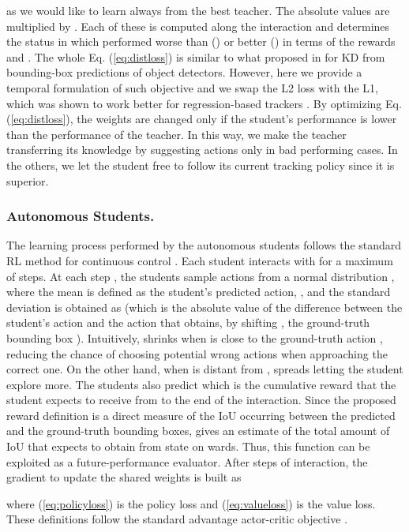 \documentclass[runningheads]{llncs}
\begin{document}
as we would like to learn always from the best teacher.
The absolute values are multiplied by . Each of these is computed along the interaction and determines the status in which  performed worse than  () or better () in terms of the rewards  and . The whole Eq. (\ref{eq:distloss}) is similar to what proposed in \cite{Chen2017} for KD from bounding-box predictions of object detectors. However, here we provide a temporal formulation of such objective and we swap the L2 loss with the L1, which was shown to work better for regression-based trackers \cite{GOTURN,RE3}.
By optimizing Eq. (\ref{eq:distloss}), the weights  are changed only if the student's performance is lower than the performance of the teacher. In this way, we make the teacher transferring its knowledge by suggesting actions only in bad performing cases. In the others, we let the student free to follow its current tracking policy since it is superior. 

\subsubsection{Autonomous Students.} The learning process performed by the autonomous students follows the standard RL method for continuous control \cite{SuttonBarto2018}. Each student interacts with  for a maximum of  steps. At each step , the students sample actions from a normal distribution , where the mean is defined as the student's predicted action, , and the standard deviation is obtained as  (which is the absolute value of the difference between the student's action and the action that obtains, by shifting , the ground-truth bounding box ). Intuitively,  shrinks when  is close to the ground-truth action , reducing the chance of choosing potential wrong actions when approaching the correct one. On the other hand, when  is distant from ,  spreads letting the student explore more. 
The students also predict  which is the cumulative reward that the student expects to receive from  to the end of the interaction. Since the proposed reward definition is a direct measure of the IoU occurring between the predicted and the ground-truth bounding boxes,  gives an estimate of the total amount of IoU that  expects to obtain from state  on wards. Thus, this function can be exploited as a future-performance evaluator. 
After  steps of interaction, the gradient to update the shared weights  is built as

where (\ref{eq:policyloss}) is the policy loss and 
(\ref{eq:valueloss}) is the value loss. These definitions follow the standard advantage actor-critic objective \cite{Sutton2000}. 
\end{document}
